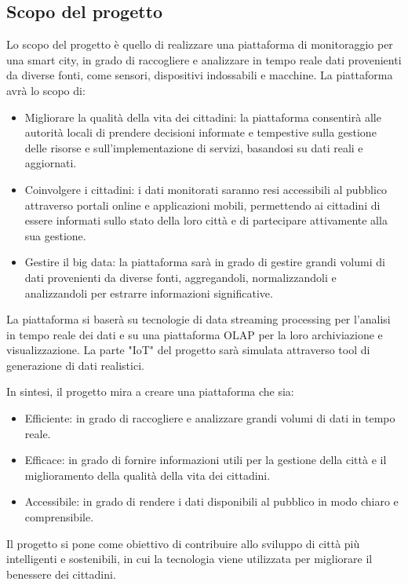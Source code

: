 \documentclass[italian,12pt]{article} %
\begin{document}
\subsection{Scopo del progetto}
Lo scopo del progetto è quello di realizzare una piattaforma di monitoraggio per una smart city, in grado di raccogliere e analizzare in tempo reale dati provenienti da diverse fonti, come sensori, dispositivi indossabili e macchine. La piattaforma avrà lo scopo di:
\begin{itemize}
	\itemsep0em
    \item Migliorare la qualità della vita dei cittadini: la piattaforma consentirà alle autorità locali di prendere decisioni informate e tempestive sulla gestione delle risorse e sull'implementazione di servizi, basandosi su dati reali e aggiornati.
    \item Coinvolgere i cittadini: i dati monitorati saranno resi accessibili al pubblico attraverso portali online e applicazioni mobili, permettendo ai cittadini di essere informati sullo stato della loro città e di partecipare attivamente alla sua gestione.
    \item Gestire il big data: la piattaforma sarà in grado di gestire grandi volumi di dati provenienti da diverse fonti, aggregandoli, normalizzandoli e analizzandoli per estrarre informazioni significative.
\end{itemize}
La piattaforma si baserà su tecnologie di data streaming processing per l'analisi in tempo reale dei dati e su una piattaforma OLAP per la loro archiviazione e visualizzazione. La parte "IoT" del progetto sarà simulata attraverso tool di generazione di dati realistici.

In sintesi, il progetto mira a creare una piattaforma che sia:
\begin{itemize}
    \item Efficiente: in grado di raccogliere e analizzare grandi volumi di dati in tempo reale.
    \item Efficace: in grado di fornire informazioni utili per la gestione della città e il miglioramento della qualità della vita dei cittadini.
    \item Accessibile: in grado di rendere i dati disponibili al pubblico in modo chiaro e comprensibile.
\end{itemize}
Il progetto si pone come obiettivo di contribuire allo sviluppo di città più intelligenti e sostenibili, in cui la tecnologia viene utilizzata per migliorare il benessere dei cittadini.
\end{document}
